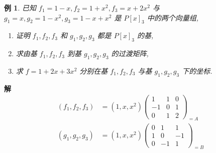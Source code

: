 \documentclass[13pt]{beamer}
\newtheorem{exa}{例}
\def\sol{{\bf 解~~ }}
\begin{document}
\begin{frame}
\begin{exa}
已知 $f_{1}=1-x, f_{2}=1+x^{2}, f_{3}=x+2 x^{2}$ 与 $g_{1}=x, g_{2}=1-x^{2}, g_{3}=1-x+x^{2}$ 是 $P[x]_{3}$ 中的两个向量组,
\begin{enumerate}
\item 证明 $f_{1}, f_{2}, f_{3}$ 和 $g_{1}, g_{2}, g_{3}$ 都是 $P[x]_{3}$ 的基,
\item 求由基 $f_{1}, f_{2}, f_{3}$ 到基 $g_{1}, g_{2}, g_{3}$ 的过渡矩阵,
\item 求 $f=1+2 x+3 x^{2}$ 分别在基 $f_{1}, f_{2}, f_{3}$ 与基 $g_{1}, g_{2}, g_{3}$ 下的坐标.
\end{enumerate}
\end{exa}
\sol 
\begin{align*}
\left(f_{1}, f_{2}, f_{3}\right) &
 =\left(1, x, x^{2}\right)\left(\begin{array}{ccc}1 & 1 & 0 \\ -1 & 0 & 1 \\ 0 & 1 & 2\end{array}\right)_{=A}\\
\left(g_{1}, g_{2}, g_{3}\right) &
 =\left(1, x, x^{2}\right)\left(\begin{array}{ccc}0 & 1 & 1 \\ 1 & 0 & -1 \\ 0 & -1 & 1\end{array}\right)_{=B}
\end{align*}
\end{frame}
\end{document}
